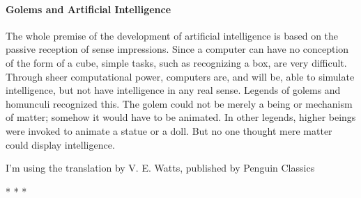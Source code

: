 \paragraph{Golems and Artificial Intelligence}
The whole premise of the development of artificial intelligence is based on the passive reception of sense impressions. Since a computer can have no conception of the form of a cube, simple tasks, such as recognizing a box, are very difficult. Through sheer computational power, computers are, and will be, able to simulate intelligence, but not have intelligence in any real sense. Legends of golems and homunculi recognized this. The golem could not be merely a being or mechanism of matter; somehow it would have to be animated. In other legends, higher beings were invoked to animate a statue or a doll. But no one thought mere matter could display intelligence.


\hfill

I'm using the translation by V. E. Watts, published by Penguin Classics




\begin{center}* * *\end{center}


